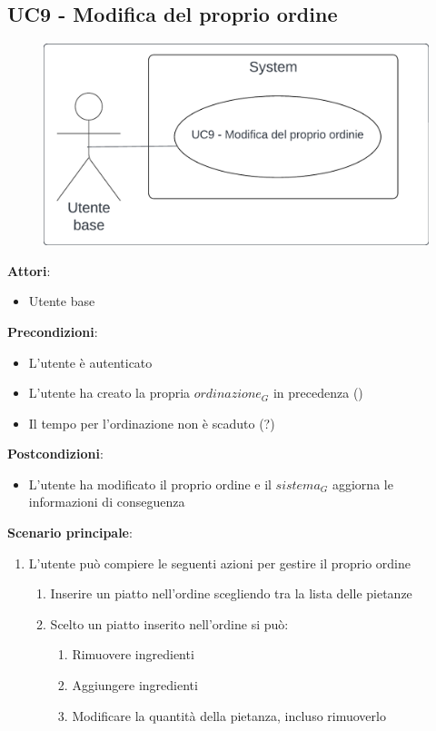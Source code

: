 \subsection{UC9 - Modifica del proprio ordine}\label{usecase:9}
\begin{figure}[H]
    \centering
    \includegraphics[width=0.9\linewidth]{ucd/ucd9.png}
\end{figure}
\textbf{Attori}:
\begin{itemize}
    \item Utente base
\end{itemize}
\textbf{Precondizioni}:
\begin{itemize}
    \item L'utente è autenticato
    \item L'utente ha creato la propria $\textit{ordinazione}_G$ in precedenza ()
    \item Il tempo per l'ordinazione non è scaduto (?)
\end{itemize}
\textbf{Postcondizioni}:
\begin{itemize}
    \item L'utente ha modificato il proprio ordine e il $\textit{sistema}_G$ aggiorna le informazioni di conseguenza
\end{itemize}
\textbf{Scenario principale}:
\begin{enumerate}
    \item L'utente può compiere le seguenti azioni per gestire il proprio ordine
    \begin{enumerate}
        \item Inserire un piatto nell'ordine scegliendo tra la lista delle pietanze
        \item Scelto un piatto inserito nell'ordine si può:
        \begin{enumerate}
            \item Rimuovere ingredienti
            \item Aggiungere ingredienti
            \item Modificare la quantità della pietanza, incluso rimuoverlo
        \end{enumerate}
    \end{enumerate}
\end{enumerate}

\newpage